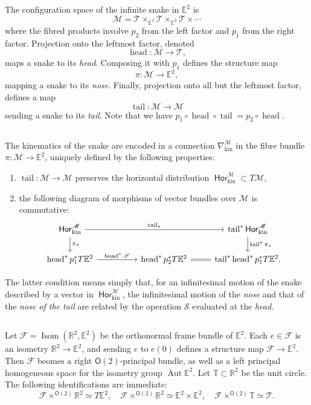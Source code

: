 \documentclass{amsart}
\def\RR{\mathbb{R}}
\def\EE{\mathbb{E}}
\def\TT{\mathbb{T}}
\def\sF{\mathscr{F}}
\def\sT{\mathscr{T}}
\def\sM{\mathscr{M}}
\def\sS{\mathscr{S}}
\DeclareMathOperator{\Isom}{\mathrm{Isom}}
\DeclareMathOperator{\Aut}{\mathrm{Aut}}
\def\O{\mathsf{O}}
\DeclareMathOperator{\stail}{{\mathrm{tail}}}
\DeclareMathOperator{\shead}{{\mathrm{head}}}
\DeclareMathOperator{\Hor}{\mathsf{Hor}}
\def\kin{\mathrm{kin}}
\theoremstyle{definition}
\begin{document}
\subsection{}
The configuration space of the infinite snake in $\EE^2$ is
$$ \sM = \sT \times_{\EE^2} \sT \times_{\EE^2} \sT \times \cdots $$
where the fibred products involve $p_2$ from the left factor and $p_1$ from the right factor.
Projection onto the leftmost factor, denoted $$ \shead : \sM \to \sT,$$ 
maps a snake to its \emph{head}.
Composing it with $p_1$ defines the structure map $$\pi : \sM \to \EE^2,$$ mapping
a snake to its \emph{nose}. Finally, projection onto all but the leftmost factor,
defines a map
$$ \stail:\sM \to \sM $$
sending a snake to its \emph{tail}.
Note that we have $p_1\circ\shead\circ\stail = p_2\circ\shead$.

\subsection{}
The kinematics of the snake are encoded in a connection $\nabla^\sM_\kin$
in the fibre bundle $\pi : \sM \to \EE^2$, uniquely defined by the following properties:
\begin{enumerate}
        \item $\stail : \sM \to \sM$ preserves the horizontal distribution $\Hor_\kin^\sM \subset T\sM$,
        \item the following diagram of morphisms of vector bundles over $\sM$ is commutative:
                $$\begin{tikzcd}
                        \Hor_\kin^\sM \arrow[rrr,"\stail_*"] \arrow[d,"\pi_*"] & & & \stail^*\Hor^\sM_\kin 
                                                                               \arrow[d,"\stail^*\pi_*"] \\
                        \shead^* p_1^* T\EE^2 \arrow[rr,"\shead^*\sS"] & & \shead^* p_2^* T\EE^2
                        \arrow[r,equal] & \stail^*\shead^*p_1^*T\EE^2.
                \end{tikzcd}$$
\end{enumerate}
The latter condition means simply that, for an infinitesimal motion
of the snake described by a vector in $\Hor^\sM_\kin$, the infinitesimal
motion of the \emph{nose} and that of the \emph{nose of the tail} are
related by the operation $\sS$ evaluated at the \emph{head}.

\subsection{}
Let $\sF = \Isom(\RR^2,\EE^2)$ be the orthonormal frame bundle of $\EE^2$.
Each $e \in \sF$ is an isometry $\RR^2 \to \EE^2$, and sending $e$ to $e(0)$
defines a structure map $\sF \to \EE^2$. Then $\sF$ beomes a right $\O(2)$-principal bundle,
as well as a left principal homogeneous space for the isometry group $\Aut\EE^2$.
Let $\TT \subset \RR^2$ be the unit circle. The following identifications are immediate:
$$
 \sF \times^{\O(2)} \RR^2 \simeq T\EE^2,\quad
 \sF \times^{\O(2)} \RR^2 \simeq \EE^2 \times \EE^2,\quad
 \sF \times^{\O(2)} \TT \simeq \sT.
$$
\end{document}
